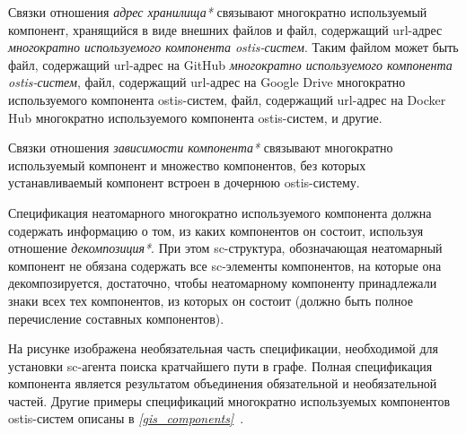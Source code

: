 Связки отношения \textit{адрес хранилища*} связывают многократно используемый компонент, хранящийся в виде внешних файлов и файл, содержащий url-адрес \textit{многократно используемого компонента ostis-систем}. Таким файлом может быть файл, содержащий url-адрес на GitHub \textit{многократно используемого компонента ostis-систем}, файл, содержащий url-адрес на Google Drive многократно используемого компонента ostis-систем, файл, содержащий url-адрес на Docker Hub многократно используемого компонента ostis-систем, и другие.

Связки отношения \textit{зависимости компонента*} связывают многократно используемый компонент и множество компонентов, без которых устанавливаемый компонент  встроен в дочернюю ostis-систему.

Спецификация неатомарного многократно используемого компонента должна содержать информацию о том, из каких компонентов он состоит, используя отношение \textit{декомпозиция*}. При этом sc-структура, обозначающая неатомарный компонент не обязана содержать все sc-элементы компонентов, на которые она декомпозируется, достаточно, чтобы неатомарному компоненту принадлежали знаки всех тех компонентов, из которых он состоит (должно быть полное перечисление составных компонентов).

На рисунке \textit{} изображена необязательная часть спецификации, необходимой для установки sc-агента поиска кратчайшего пути в графе. Полная спецификация компонента является результатом объединения обязательной и необязательной частей. Другие примеры спецификаций многократно используемых компонентов ostis-систем описаны в \textit{\ref{gis_components}~}.

